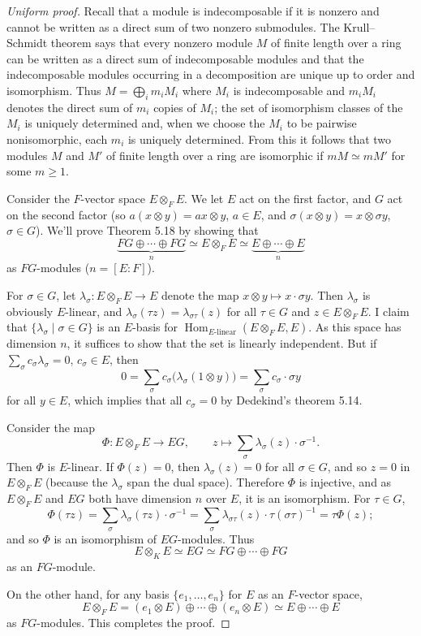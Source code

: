 \documentclass[UTF8,11pt]{ctexart}
\theoremstyle{definition}
\DeclareMathOperator{\Hom}{Hom}
\begin{document}
\begin{proof}[Uniform proof]
Recall that a module is indecomposable if it is nonzero and cannot be written as a direct sum of two nonzero submodules. The Krull--Schmidt theorem says that every nonzero module $M$ of finite length over a ring can be written as a direct sum of indecomposable modules and that the indecomposable modules occurring in a decomposition are unique up to order and isomorphism. Thus $M=\bigoplus_i m_iM_i$ where $M_i$ is indecomposable and $m_iM_i$ denotes the direct sum of $m_i$ copies of $M_i$; the set of isomorphism classes of the $M_i$ is uniquely determined and, when we choose the $M_i$ to be pairwise nonisomorphic, each $m_i$ is uniquely determined. From this it follows that two modules $M$ and $M'$ of finite length over a ring are isomorphic if $mM\simeq mM'$ for some $m\geq1$.

Consider the $F$-vector space $E\otimes_F E$. We let $E$ act on the first factor, and $G$ act on the second factor (so $a(x\otimes y)=ax\otimes y$, $a\in E$, and $\sigma(x\otimes y)=x\otimes\sigma y$, $\sigma\in G$). We'll prove Theorem 5.18 by showing that
\[
\underbrace{FG\oplus\cdots\oplus FG}_{n}\simeq E\otimes_F E
\simeq\underbrace{E\oplus\cdots\oplus E}_{n}
\]
as $FG$-modules ($n=[E:F]$).

For $\sigma\in G$, let $\lambda_\sigma:E\otimes_F E\to E$ denote the map $x\otimes y\mapsto x\cdot\sigma y$. Then $\lambda_\sigma$ is obviously $E$-linear, and $\lambda_\sigma(\tau z)=\lambda_{\sigma\tau}(z)$ for all $\tau\in G$ and $z\in E\otimes_F E$. I claim that $\{\lambda_\sigma\mid\sigma\in G\}$ is an $E$-basis for $\Hom_{E\text{-linear}}(E\otimes_F E,E)$. As this space has dimension $n$, it suffices to show that the set is linearly independent. But if $\sum_\sigma c_\sigma\lambda_\sigma=0$, $c_\sigma\in E$, then
\[
0=\sum_\sigma c_\sigma\bigl(\lambda_\sigma(1\otimes y)\bigr)
=\sum_\sigma c_\sigma\cdot\sigma y
\]
for all $y\in E$, which implies that all $c_\sigma=0$ by Dedekind's theorem 5.14.

Consider the map
\[
\Phi:E\otimes_F E\longrightarrow EG,\qquad
z\longmapsto\sum_\sigma\lambda_\sigma(z)\cdot\sigma^{-1}.
\]
Then $\Phi$ is $E$-linear. If $\Phi(z)=0$, then $\lambda_\sigma(z)=0$ for all $\sigma\in G$, and so $z=0$ in $E\otimes_F E$ (because the $\lambda_\sigma$ span the dual space). Therefore $\Phi$ is injective, and as $E\otimes_F E$ and $EG$ both have dimension $n$ over $E$, it is an isomorphism. For $\tau\in G$,
\[
\Phi(\tau z)=\sum_\sigma\lambda_\sigma(\tau z)\cdot\sigma^{-1}
=\sum_\sigma\lambda_{\sigma\tau}(z)\cdot\tau(\sigma\tau)^{-1}
=\tau\Phi(z);
\]
and so $\Phi$ is an isomorphism of $EG$-modules. Thus
\[
E\otimes_K E\simeq EG\simeq FG\oplus\cdots\oplus FG
\]
as an $FG$-module.

On the other hand, for any basis $\{e_1,\ldots,e_n\}$ for $E$ as an $F$-vector space,
\[
E\otimes_F E=(e_1\otimes E)\oplus\cdots\oplus(e_n\otimes E)
\simeq E\oplus\cdots\oplus E
\]
as $FG$-modules. This completes the proof.
\end{proof}
\end{document}
